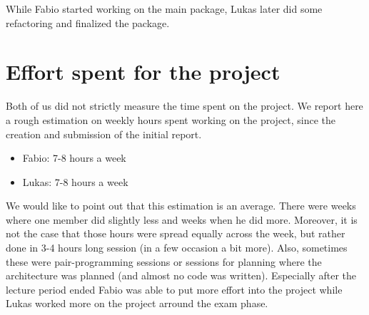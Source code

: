 \documentclass[a4paper,english,10pt,NET]{tumarticle}
\begin{document}
While Fabio started working on the main package, Lukas later did some refactoring and finalized the package.

\section{Effort spent for the project}
Both of us did not strictly measure the time spent on the project. We report here a rough estimation on weekly hours spent working on the project, since the creation and submission of the initial report.


\begin{itemize}
	\item Fabio: 7-8 hours a week
	\item Lukas: 7-8 hours a week
\end{itemize}

We would like to point out that this estimation is an average.
There were weeks where one member did slightly less and weeks when he did more.
Moreover, it is not the case that those hours were spread equally across the week, but rather done in 3-4 hours long session (in a few occasion a bit more).
Also, sometimes these were pair-programming sessions or sessions for planning where the architecture was planned (and almost no code was written).
Especially after the lecture period ended Fabio was able to put more effort into the project while Lukas worked more on the project arround the exam phase.

\todos
\end{document}
